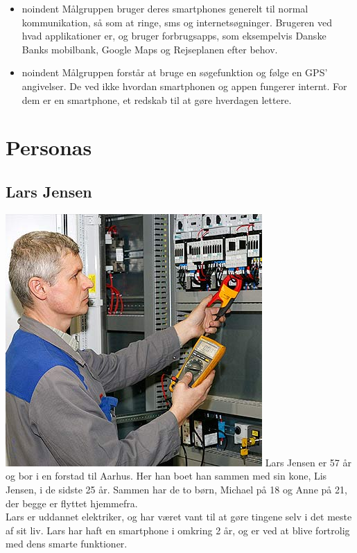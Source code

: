 \documentclass[12pt]{article}
\begin{document}
\begin{itemize}
\item noindent Målgruppen bruger deres smartphones generelt til normal kommunikation, så som at ringe, sms og internetsøgninger. Brugeren ved hvad applikationer er, og bruger forbrugsapps, som eksempelvis Danske Banks mobilbank, Google Maps og Rejseplanen efter behov.\\

\item noindent Målgruppen forstår at bruge en søgefunktion og følge en GPS' angivelser. De ved ikke hvordan smartphonen og appen fungerer internt. For dem er en smartphone, et redskab til at gøre hverdagen lettere.
\end{itemize}

\section{Personas}

\subsection{Lars Jensen}

\includegraphics[scale=0.5]{includes/lars.jpg}
Lars Jensen er 57 år og bor i en forstad til Aarhus. Her han boet han sammen med sin kone, Lis Jensen, i de sidste 25 år. Sammen har de to børn, Michael på 18 og Anne på 21, der begge er flyttet hjemmefra.\\

\noindent Lars er uddannet elektriker, og har været vant til at gøre tingene selv i det meste af sit liv. Lars har haft en smartphone i omkring 2 år, og er ved at blive fortrolig med dens smarte funktioner.\\
\end{document}
